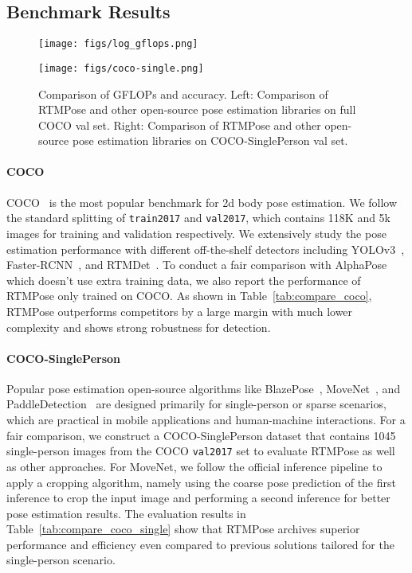 \documentclass[final]{cvpr}
\begin{document}
{\subsection{Benchmark Results}

\begin{figure*}[htp]
    \centering
    \begin{minipage}[t]{0.48\textwidth}
    \centering
    \texttt{[image: figs/log\_gflops.png]}
\end{minipage}
    \begin{minipage}[t]{0.48\textwidth}
    \centering
    \texttt{[image: figs/coco-single.png]}
\end{minipage}
    \caption{Comparison of GFLOPs and accuracy. Left: Comparison of RTMPose and other open-source pose estimation libraries on full COCO val set. Right: Comparison of RTMPose and other open-source pose estimation libraries on COCO-SinglePerson val set.}
    \label{fig:compare_gflops}
\end{figure*}

\paragraph{COCO}
COCO~\cite{lin2014coco} is the most popular benchmark for 2d body pose estimation. We follow the standard splitting of \texttt{train2017} and \texttt{val2017}, which contains 118K and 5k images for training and validation respectively. We extensively study the pose estimation performance with different off-the-shelf detectors including YOLOv3~\cite{JosephRedmon2018YOLOv3AI}, Faster-RCNN~\cite{ShaoqingRen2015FasterRT}, and RTMDet~\cite{lyu2022rtmdet}. To conduct a fair comparison with AlphaPose~\cite{alphapose} which doesn't use extra training data, we also report the performance of RTMPose only trained on COCO. As shown in Table~\ref{tab:compare_coco}, RTMPose outperforms competitors by a large margin with much lower complexity and shows strong robustness for detection.

\paragraph{COCO-SinglePerson}
Popular pose estimation open-source algorithms like BlazePose~\cite{blazepose}, MoveNet~\cite{RonnyVotel2023NextGenerationPD}, and PaddleDetection~\cite{ppdet2019} are designed primarily for single-person or sparse scenarios, which are practical in mobile applications and human-machine interactions. For a fair comparison, we construct a COCO-SinglePerson dataset that contains 1045 single-person images from the COCO \texttt{val2017} set to evaluate RTMPose as well as other approaches. For MoveNet, we follow the official inference pipeline to apply a cropping algorithm, namely using the coarse pose prediction of the first inference to crop the input image and performing a second inference for better pose estimation results. The evaluation results in Table~\ref{tab:compare_coco_single} show that RTMPose archives superior performance and efficiency even compared to previous solutions tailored for the single-person scenario.

}
\end{document}
